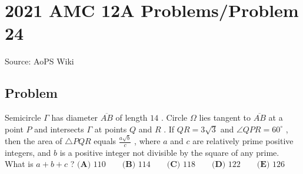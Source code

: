 \documentclass[12pt]{article}
\begin{document}
\section*{{2021 AMC 12A Problems/Problem 24}}
Source: AoPS Wiki

\subsection*{Problem}
Semicircle $\Gamma$ has diameter $\overline{AB}$ of length $14$ . Circle $\Omega$ lies tangent to $\overline{AB}$ at a point $P$ and intersects $\Gamma$ at points $Q$ and $R$ . If $QR=3\sqrt3$ and $\angle QPR=60^\circ$ , then the area of $\triangle PQR$ equals $\tfrac{a\sqrt{b}}{c}$ , where $a$ and $c$ are relatively prime positive integers, and $b$ is a positive integer not divisible by the square of any prime. What is $a+b+c$ ? $\textbf{(A) }110 \qquad \textbf{(B) }114 \qquad \textbf{(C) }118 \qquad \textbf{(D) }122\qquad \textbf{(E) }126$
\end{document}
